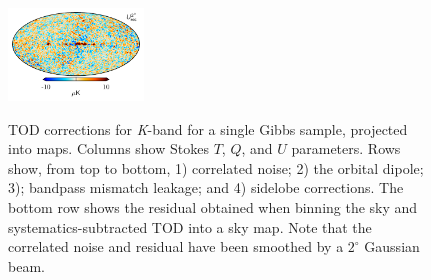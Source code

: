 \documentclass[twocolumn]{../../common/aa}
\newcommand{\K}[0]{\textit K}
\begin{document}
\begin{figure}[t]
	\includegraphics[width=0.32\textwidth]{figures/K_res_U.pdf}\\
	\caption{TOD corrections for \K-band for a single Gibbs sample, projected into maps. Columns show Stokes $T$, $Q$, and $U$ parameters. Rows show, from top to bottom, 1) correlated noise; 2) the orbital dipole; 3); bandpass mismatch leakage; and 4) sidelobe corrections. The bottom row shows the residual obtained when binning the sky and systematics-subtracted TOD into a sky map. Note that the correlated noise and residual have been smoothed by a $2^\circ$ Gaussian beam.}
	\label{fig:tod_corrections}
\end{figure}
\end{document}
